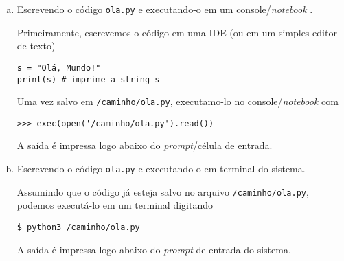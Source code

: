 \begin{ex}
\begin{enumerate}[a)]
  \item Escrevendo o código \verb+ola.py+ e executando-o em um console/\textit{notebook} {\python}.
  
  Primeiramente, escrevemos o código em uma IDE (ou em um simples editor de texto)

\begin{lstlisting}[framexrightmargin=-1.4em]
s = "Olá, Mundo!"
print(s) # imprime a string s
\end{lstlisting}

Uma vez salvo em \texttt{/caminho/ola.py}, executamo-lo no console/\textit{notebook} {\python} com

\begin{lstlisting}[framexrightmargin=-1.4em]
>>> exec(open('/caminho/ola.py').read())
\end{lstlisting}

A saída é impressa logo abaixo do \textit{prompt}/célula de entrada.
  
  \item Escrevendo o código \verb+ola.py+ e executando-o em terminal do sistema.
  
  Assumindo que o código já esteja salvo no arquivo \texttt{/caminho/ola.py}, podemos executá-lo em um terminal digitando

\begin{lstlisting}[framexrightmargin=-1.4em]
$ python3 /caminho/ola.py
\end{lstlisting}

  A saída é impressa logo abaixo do \textit{prompt} de entrada do sistema.
\end{enumerate}

\end{ex}
